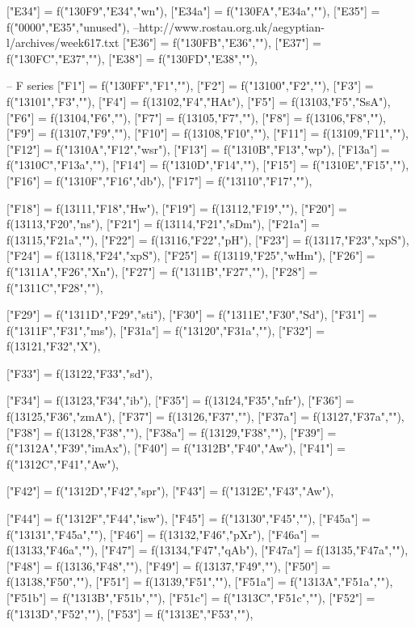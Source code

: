 \documentclass{article}
\begin{document}
\begin{luacode*}
{	["E34"] 		= f("130F9","E34","wn"),
	["E34a"] 		= f("130FA","E34a",""),
	["E35"] 		= f("0000","E35","unused"), --http://www.rostau.org.uk/aegyptian-l/archives/week617.txt
	["E36"] 		= f("130FB","E36",""),
	["E37"] 		= f("130FC","E37",""),
	["E38"] 		= f("130FD","E38",""),

-- F series
	["F1"] 		= f("130FF","F1",""),
	["F2"] 		= f("13100","F2",""),
	["F3"] 		= f("13101","F3",""),
	["F4"] 		= f(13102,"F4","HAt"),
	["F5"] 		= f(13103,"F5","SsA"),
	["F6"] 		= f(13104,"F6",""),
	["F7"] 		= f(13105,"F7",""),
	["F8"] 		= f(13106,"F8",""),
	["F9"] 		= f(13107,"F9",""),
	["F10"] 		= f(13108,"F10",""),
	["F11"] 		= f(13109,"F11",""),
	["F12"] 		= f("1310A","F12","wsr"),
	["F13"] 		= f("1310B","F13","wp"),
	["F13a"] 		= f("1310C","F13a",""),
	["F14"] 		= f("1310D","F14",""),
	["F15"] 		= f("1310E","F15",""),
	["F16"] 		= f("1310F","F16","db"),
	["F17"] 		= f("13110","F17",""),

	["F18"] 		= f(13111,"F18","Hw"),
	["F19"] 		= f(13112,"F19",""),
	["F20"] 		= f(13113,"F20","ns"),
	["F21"] 		= f(13114,"F21","sDm"),
	["F21a"] 		= f(13115,"F21a",""),
	["F22"] 		= f(13116,"F22","pH"),
	["F23"] = f(13117,"F23","xpS"),
	["F24"] = f(13118,"F24","xpS"),
	["F25"] = f(13119,"F25","wHm"),
	["F26"] = f("1311A","F26","Xn"),
	["F27"] = f("1311B","F27",""),
	["F28"] = f("1311C","F28",""),

	["F29"] = f("1311D","F29","sti"),
	["F30"] = f("1311E","F30","Sd"),
	["F31"] = f("1311F","F31","ms"),
["F31a"] = f("13120","F31a",""),
["F32"] = f(13121,"F32","X"),

	["F33"] = f(13122,"F33","sd"),

	["F34"] = f(13123,"F34","ib"),
	["F35"] = f(13124,"F35","nfr"),
	["F36"] = f(13125,"F36","zmA"),
	["F37"] = f(13126,"F37",""),
	["F37a"] = f(13127,"F37a",""),
	["F38"] = f(13128,"F38",""),
	["F38a"] = f(13129,"F38",""),
	["F39"] = f("1312A","F39","imAx"),
	["F40"] = f("1312B","F40","Aw"),
	["F41"] = f("1312C","F41","Aw"),

	["F42"] = f("1312D","F42","spr"),
	["F43"] = f("1312E","F43","Aw"),

	["F44"] = f("1312F","F44","isw"),
	["F45"] = f("13130","F45",""),
	["F45a"] = f("13131","F45a",""),
	["F46"] = f(13132,"F46","pXr"),
	["F46a"] = f(13133,"F46a",""),
	["F47"] = f(13134,"F47","qAb"),
	["F47a"] = f(13135,"F47a",""),
	["F48"] = f(13136,"F48",""),
	["F49"] = f(13137,"F49",""),
	["F50"] = f(13138,"F50",""),
	["F51"] = f(13139,"F51",""),
	["F51a"] = f("1313A","F51a",""),
	["F51b"] = f("1313B","F51b",""),
	["F51c"] = f("1313C","F51c",""),
	["F52"] = f("1313D","F52",""),
	["F53"] = f("1313E","F53",""),


}
\end{luacode*}
\end{document}
